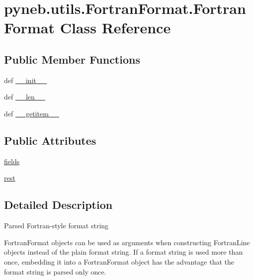 \hypertarget{classpyneb_1_1utils_1_1_fortran_format_1_1_fortran_format}{\section{pyneb.\-utils.\-Fortran\-Format.\-Fortran\-Format Class Reference}
\label{classpyneb_1_1utils_1_1_fortran_format_1_1_fortran_format}
}
\subsection*{Public Member Functions}
\begin{DoxyCompactItemize}
\item 
def \hyperlink{classpyneb_1_1utils_1_1_fortran_format_1_1_fortran_format_a7fc0109f1fa73801ad3795463473e41a}{\-\_\-\-\_\-init\-\_\-\-\_\-}
\item 
def \hyperlink{classpyneb_1_1utils_1_1_fortran_format_1_1_fortran_format_a77cfb4790c3589e017b50ad41dea1cfc}{\-\_\-\-\_\-len\-\_\-\-\_\-}
\item 
def \hyperlink{classpyneb_1_1utils_1_1_fortran_format_1_1_fortran_format_ac25a64e14a5cd2579342930494710e11}{\-\_\-\-\_\-getitem\-\_\-\-\_\-}
\end{DoxyCompactItemize}
\subsection*{Public Attributes}
\begin{DoxyCompactItemize}
\item 
\hyperlink{classpyneb_1_1utils_1_1_fortran_format_1_1_fortran_format_ac8f962282ba9e35ccd8dad5feacd3813}{fields}
\item 
\hyperlink{classpyneb_1_1utils_1_1_fortran_format_1_1_fortran_format_a6567d6b3709b1db086972c2fe1855006}{rest}
\end{DoxyCompactItemize}


\subsection{Detailed Description}
\begin{DoxyVerb}Parsed Fortran-style format string

FortranFormat objects can be used as arguments when constructing
FortranLine objects instead of the plain format string. If a
format string is used more than once, embedding it into a FortranFormat
object has the advantage that the format string is parsed only once.
\end{DoxyVerb}
 

